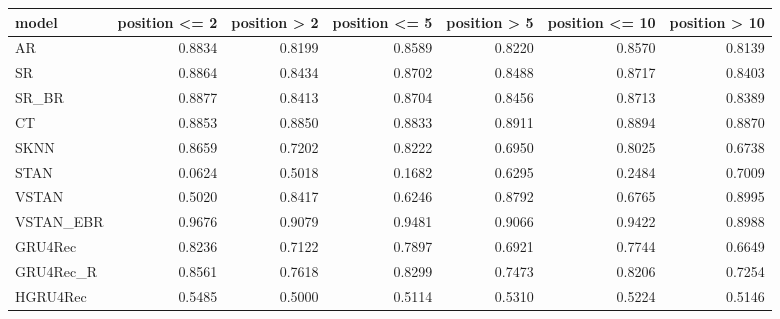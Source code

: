 \begin{tabular}{lrrrrrr}
\toprule
     model &  position <= 2 &  position > 2 &  position <= 5 &  position > 5 &  position <= 10 &  position > 10 \\
\midrule
        AR &         0.8834 &        0.8199 &         0.8589 &        0.8220 &          0.8570 &         0.8139 \\
        SR &         0.8864 &        0.8434 &         0.8702 &        0.8488 &          0.8717 &         0.8403 \\
     SR\_BR &         0.8877 &        0.8413 &         0.8704 &        0.8456 &          0.8713 &         0.8389 \\
        CT &         0.8853 &        0.8850 &         0.8833 &        0.8911 &          0.8894 &         0.8870 \\
      SKNN &         0.8659 &        0.7202 &         0.8222 &        0.6950 &          0.8025 &         0.6738 \\
      STAN &         0.0624 &        0.5018 &         0.1682 &        0.6295 &          0.2484 &         0.7009 \\
     VSTAN &         0.5020 &        0.8417 &         0.6246 &        0.8792 &          0.6765 &         0.8995 \\
 VSTAN\_EBR &         0.9676 &        0.9079 &         0.9481 &        0.9066 &          0.9422 &         0.8988 \\
   GRU4Rec &         0.8236 &        0.7122 &         0.7897 &        0.6921 &          0.7744 &         0.6649 \\
 GRU4Rec\_R &         0.8561 &        0.7618 &         0.8299 &        0.7473 &          0.8206 &         0.7254 \\
  HGRU4Rec &         0.5485 &        0.5000 &         0.5114 &        0.5310 &          0.5224 &         0.5146 \\
\bottomrule
\end{tabular}
